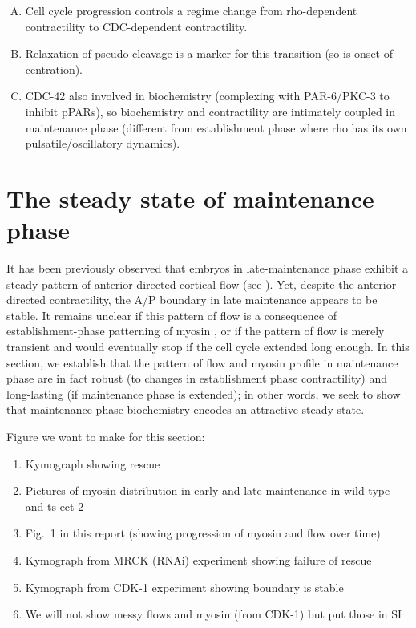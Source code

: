 \documentclass[11pt]{article}
\newcommand{\red}[1]{\color{red}#1\normalcolor}
\newcommand{\6}[1]{#1_{\text{6}}}
\newcommand{\3}[1]{#1_{\text{3}}}
\begin{document}
\red{
\begin{enumerate}[(A)]
 \item Cell cycle progression controls a regime change from rho-dependent contractility to CDC-dependent contractility.
\item Relaxation of pseudo-cleavage is a marker for this transition (so is onset of centration).
\item CDC-42 also involved in biochemistry (complexing with PAR-6/PKC-3 to inhibit pPARs), so biochemistry and contractility are intimately coupled in maintenance phase (different from establishment phase where rho has its own pulsatile/oscillatory dynamics). 
\end{enumerate}
}

\section{The steady state of maintenance phase }
It has been previously observed that embryos in late-maintenance phase exhibit a steady pattern of anterior-directed cortical flow (see \cite[Fig.~2]{sailer2015dynamic}). Yet, despite the anterior-directed contractility, the A/P boundary in late maintenance appears to be stable. It remains unclear if this pattern of flow is a consequence of establishment-phase patterning of myosin \cite{munro2004cortical}, or if the pattern of flow is merely transient and would eventually stop if the cell cycle extended long enough. In this section, we establish that the pattern of flow and myosin profile in maintenance phase are in fact robust (to changes in establishment phase contractility) and long-lasting (if maintenance phase is extended); in other words, we seek to show that maintenance-phase biochemistry encodes an attractive steady state. 

\red{Figure we want to make for this section:
\begin{enumerate}[label=(\alph*),topsep=0pt,itemsep=-2ex]
\item Kymograph showing rescue
\item Pictures of myosin distribution in early and late maintenance in wild type and ts ect-2
\item Fig.\ 1 in this report (showing progression of myosin and flow over time)
\item Kymograph from MRCK (RNAi) experiment showing failure of rescue
\item Kymograph from CDK-1 experiment showing boundary is stable 
\item We will not show messy flows and myosin (from CDK-1) but put those in SI
\end{enumerate}
}
\end{document}
